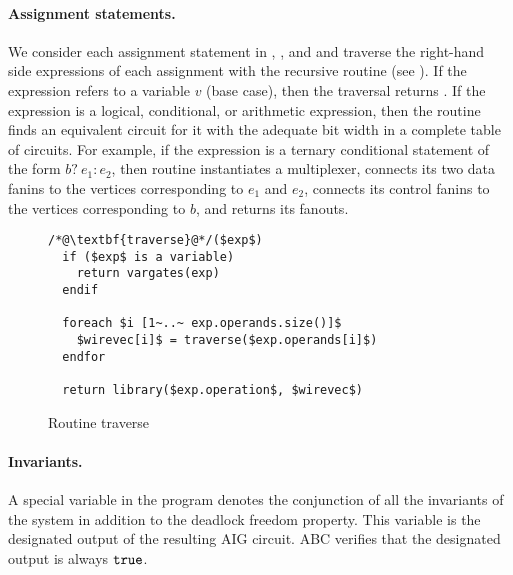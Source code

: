 \paragraph{Assignment statements.}
We consider each assignment statement in , ,
and  and traverse the right-hand side expressions of
each assignment with the recursive  routine (see ).
%
If the expression refers to a variable $v$ (base case), 
then the traversal returns . 
%
If the expression is a logical, conditional, or arithmetic expression, then
the  routine finds an equivalent circuit for it with the adequate bit
width in a complete table of circuits.
For example, if the expression is a ternary conditional statement of the
form $b?~e_1:e_2$, then routine  instantiates a multiplexer, 
connects its two data fanins to the vertices corresponding to $e_1$ and $e_2$, connects its control fanins to the vertices corresponding to $b$,
and returns its fanouts. 
%
\begin{figure}
\begin{lstlisting}
/*@\textbf{traverse}@*/($exp$)
  if ($exp$ is a variable) 
    return vargates(exp)
  endif

  foreach $i [1~..~ exp.operands.size()]$ 
    $wirevec[i]$ = traverse($exp.operands[i]$) 
  endfor

  return library($exp.operation$, $wirevec$)
\end{lstlisting}
\caption{Routine traverse}
\label{fig:traverse-listing}
\end{figure}
%
%
%

\paragraph{Invariants.}
%
A special variable in the \caig program denotes the conjunction of all the invariants of the system in addition to the deadlock freedom property. This variable is the designated output of the resulting 
AIG circuit. ABC verifies that the designated output is always $\mathtt{true}$. 
%

